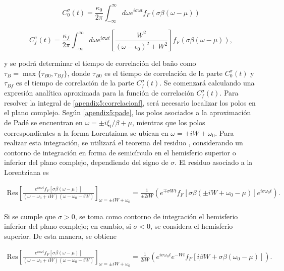 \begin{appendixs}
\begin{equation}
    C^{\sigma}_{0}(t) = \frac{\kappa_{0}}{2\pi} \int_{-\infty}^{\infty}d\omega e^{i\sigma \omega t} f_{F}(\sigma \beta (\omega-\mu))
    \label{apendix5:correlacion0}
\end{equation}

\begin{equation}
    C^{\sigma}_{f}(t) = \frac{\kappa_{f}}{2\pi} \int_{-\infty}^{\infty}d\omega e^{i\sigma \omega t}\left[ \frac{W^{2}}{(\omega-\epsilon_{0})^{2} + W^{2}} \right] f_{F}(\sigma \beta (\omega-\mu)),
    \label{apendix5:correlacionf}
\end{equation}

y se podrá determinar el tiempo de correlación del baño como $\tau_{B} = \max\{\tau_{B0}, \tau_{Bf}\}$, donde $\tau_{B0}$ es el tiempo de correlación de la parte $C^{\sigma}_{0}(t)$ y $\tau_{Bf}$ es el tiempo de correlación de la parte $C^{\sigma}_{f}(t)$. Se comenzará calculando una expresión analítica aproximada para la función de correlación $C^{\sigma}_{f}(t)$. Para resolver la integral de \ref{apendix5:correlacionf}, será necesario localizar los polos en el plano complejo. Según \ref{apendix5:pade}, los polos asociados a la aproximación de Padé se encuentran en $\omega = \pm i \xi_{l}/\beta + \mu$, mientras que los polos correspondientes a la forma Lorentziana se ubican en $\omega = \pm i W + \omega_{0}$. Para realizar esta integración, se utilizará el teorema del residuo \cite{riley2006mathematical}, considerando un contorno de integración en forma de semicírculo en el hemisferio superior o inferior del plano complejo, dependiendo del signo de $\sigma$. El residuo asociado a la Lorentziana es

\begin{align*}
   \text{Res} \left[ \frac{e^{ i\sigma \omega t} f_{F}[\sigma \beta (\omega-\mu)] }{ (\omega-\omega_{0} + iW)(\omega -\omega_{0} -iW)}\right]_{\omega = \pm i W + \omega_{0}} = \frac{1}{\pm 2iW} ( e^{\mp \sigma Wt} f_{F}[\sigma \beta(\pm iW +\omega_{0}-\mu)]e^{i\sigma \omega_{0}t}). 
\end{align*}

Si se cumple que $\sigma > 0$, se toma como contorno de integración el hemisferio inferior del plano complejo; en cambio, si $\sigma < 0$, se considera el hemisferio superior. De esta manera, se obtiene

\begin{align*}
    \text{Res} \left[ \frac{e^{ i\sigma \omega t} f_{F}[\sigma \beta (\omega-\mu)] }{ (\omega-\omega_{0} + iW)(\omega -\omega_{0} -iW)}\right]_{\omega = \pm i W + \omega_{0}} = \frac{1}{ 2iW} ( e^{i\sigma \omega_{0}t}e^{- Wt} f_{F}[i\beta W + \sigma \beta(\omega_{0}-\mu)]). 
 \end{align*}


\end{appendixs}
